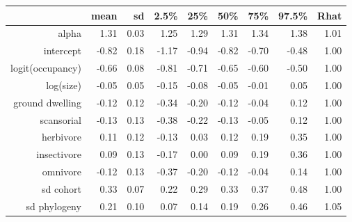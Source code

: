 \begin{table}[ht]
\centering
\begin{tabular}{rrrrrrrrr}
  \hline
 & mean & sd & 2.5\% & 25\% & 50\% & 75\% & 97.5\% & Rhat \\ 
  \hline
alpha & 1.31 & 0.03 & 1.25 & 1.29 & 1.31 & 1.34 & 1.38 & 1.01 \\ 
  intercept & -0.82 & 0.18 & -1.17 & -0.94 & -0.82 & -0.70 & -0.48 & 1.00 \\ 
  logit(occupancy) & -0.66 & 0.08 & -0.81 & -0.71 & -0.65 & -0.60 & -0.50 & 1.00 \\ 
  log(size) & -0.05 & 0.05 & -0.15 & -0.08 & -0.05 & -0.01 & 0.05 & 1.00 \\ 
  ground dwelling & -0.12 & 0.12 & -0.34 & -0.20 & -0.12 & -0.04 & 0.12 & 1.00 \\ 
  scansorial & -0.13 & 0.13 & -0.38 & -0.22 & -0.13 & -0.05 & 0.12 & 1.00 \\ 
  herbivore & 0.11 & 0.12 & -0.13 & 0.03 & 0.12 & 0.19 & 0.35 & 1.00 \\ 
  insectivore & 0.09 & 0.13 & -0.17 & 0.00 & 0.09 & 0.19 & 0.36 & 1.00 \\ 
  omnivore & -0.12 & 0.13 & -0.37 & -0.20 & -0.12 & -0.04 & 0.14 & 1.00 \\ 
  sd cohort & 0.33 & 0.07 & 0.22 & 0.29 & 0.33 & 0.37 & 0.48 & 1.00 \\ 
  sd phylogeny & 0.21 & 0.10 & 0.07 & 0.14 & 0.19 & 0.26 & 0.46 & 1.05 \\ 
   \hline
\end{tabular}
\label{post_sum}
\end{table}
